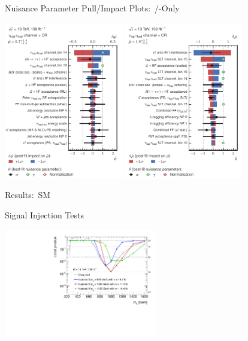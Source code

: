 \documentclass[11pt, xcolor={dvipsnames}, aspectratio=169, notes]{beamer}
\begin{document}

\begin{frame}{Nuisance Parameter Pull/Impact Plots:\ \allbold{\hadhad}/\allbold{\lephad}-Only}
  \centering

  \includegraphics[width=0.39\textwidth]{results_nonres/rankings/ranking_nonres_hadhad}\hspace*{3em}
  \includegraphics[width=0.39\textwidth]{results_nonres/rankings/ranking_nonres_lephad}
\end{frame}


\begin{frame}{Results:\ SM~\allbold{\HH}}
  \centering\footnotesize

  
\end{frame}


\begin{frame}{Signal Injection Tests}
  \centering

  \includegraphics[width=0.5\textwidth]{results_res/injection}
\end{frame}
\end{document}
